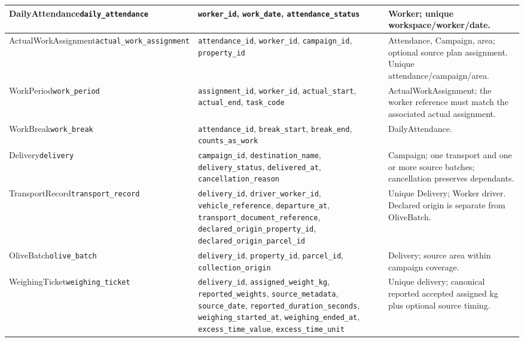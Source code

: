 {\begin{longtable}{L{0.27}L{0.4}L{0.33}}
\midrule
DailyAttendance\newline \texttt{daily\_\allowbreak{}attendance} & \mbox{\texttt{worker\_id}}, \mbox{\texttt{work\_date}}, \mbox{\texttt{attendance\_status}} & Worker; unique workspace/worker/date. \\
\midrule
ActualWorkAssignment\newline \texttt{actual\_\allowbreak{}work\_\allowbreak{}assignment} & \mbox{\texttt{attendance\_id}}, \mbox{\texttt{worker\_id}}, \mbox{\texttt{campaign\_id}}, \mbox{\texttt{property\_id}} & Attendance, Campaign, area; optional source plan assignment. Unique attendance/campaign/area. \\
\midrule
WorkPeriod\newline \texttt{work\_\allowbreak{}period} & \mbox{\texttt{assignment\_id}}, \mbox{\texttt{worker\_id}}, \mbox{\texttt{actual\_start}}, \mbox{\texttt{actual\_end}}, \mbox{\texttt{task\_code}} & ActualWorkAssignment; the worker reference must match the associated actual assignment. \\
\midrule
WorkBreak\newline \texttt{work\_\allowbreak{}break} & \mbox{\texttt{attendance\_id}}, \mbox{\texttt{break\_start}}, \mbox{\texttt{break\_end}}, \mbox{\texttt{counts\_as\_work}} & DailyAttendance. \\
\midrule
Delivery\newline \texttt{delivery} & \mbox{\texttt{campaign\_id}}, \mbox{\texttt{destination\_name}}, \mbox{\texttt{delivery\_status}}, \mbox{\texttt{delivered\_at}}, \mbox{\texttt{cancellation\_reason}} & Campaign; one transport and one or more source batches; cancellation preserves dependants. \\
\midrule
TransportRecord\newline \texttt{transport\_\allowbreak{}record} & \mbox{\texttt{delivery\_id}}, \mbox{\texttt{driver\_worker\_id}}, \mbox{\texttt{vehicle\_reference}}, \mbox{\texttt{departure\_at}}, \mbox{\texttt{transport\_document\_reference}}, \mbox{\texttt{declared\_origin\_property\_id}}, \mbox{\texttt{declared\_origin\_parcel\_id}} & Unique Delivery; Worker driver. Declared origin is separate from OliveBatch. \\
\midrule
OliveBatch\newline \texttt{olive\_\allowbreak{}batch} & \mbox{\texttt{delivery\_id}}, \mbox{\texttt{property\_id}}, \mbox{\texttt{parcel\_id}}, \mbox{\texttt{collection\_origin}} & Delivery; source area within campaign coverage. \\
\midrule
WeighingTicket\newline \texttt{weighing\_\allowbreak{}ticket} & \mbox{\texttt{delivery\_id}}, \mbox{\texttt{assigned\_weight\_kg}}, \mbox{\texttt{reported\_weights}}, \mbox{\texttt{source\_metadata}}, \mbox{\texttt{source\_date}}, \mbox{\texttt{reported\_duration\_seconds}}, \mbox{\texttt{weighing\_started\_at}}, \mbox{\texttt{weighing\_ended\_at}}, \mbox{\texttt{excess\_time\_value}}, \mbox{\texttt{excess\_time\_unit}} & Unique delivery; canonical reported accepted assigned kg plus optional source timing. \\

\end{longtable}}
